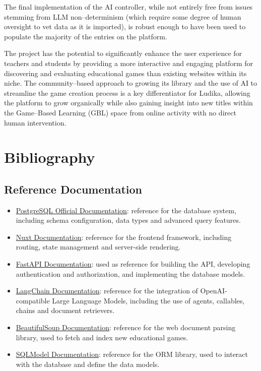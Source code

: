 \documentclass[11pt,italian,a4paper]{article}
\begin{document}
The final implementation of the AI controller, while not entirely free from issues stemming from LLM non--determinism (which require some degree of human oversight to vet data as it is imported), is robust enough to have been used to populate the majority of the entries on the platform.

The project has the potential to significantly enhance the user experience for teachers and students by providing a more interactive and engaging platform for discovering and evaluating educational games than existing websites within its niche. The community--based approach to growing its library and the use of AI to streamline the game creation process is a key differentiator for Ludika, allowing the platform to grow organically while also gaining insight into new titles within the Game--Based Learning (GBL) space from online activity with no direct human intervention.

\pagebreak
\section{Bibliography}

\subsection{Reference Documentation}
\begin{itemize}
    \item \href{https://www.postgresql.org/docs/current/}{PostgreSQL Official Documentation}: reference for the database system, including schema configuration, data types and advanced query features.
    \item \href{https://nuxt.com/docs/getting-started/introduction}{Nuxt Documentation}: reference for the frontend framework, including routing, state management and server-side rendering.
    \item \href{https://fastapi.tiangolo.com/tutorial/}{FastAPI Documentation}: used as reference for building the API, developing authentication and authorization, and implementing the database models.
    \item \href{https://langchain.com/docs/get_started/introduction.html}{LangChain Documentation}: reference for the integration of OpenAI-compatible Large Language Models, including the use of agents, callables, chains and document retrievers.
    \item \href{https://www.crummy.com/software/BeautifulSoup/bs4/doc/}{BeautifulSoup Documentation}: reference for the web document parsing library, used to fetch and index new educational games.
    \item \href{https://sqlmodel.tiangolo.com/}{SQLModel Documentation}: reference for the ORM library, used to interact with the database and define the data models.
\end{itemize}
\end{document}
